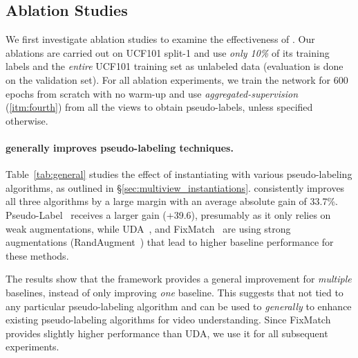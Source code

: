 \documentclass[10pt,twocolumn,letterpaper]{article}
\newcommand{\sref}[1]{\S\ref{#1}}
\begin{document}
\subsection{Ablation Studies}\label{sec:ablation}
We first investigate ablation studies to examine the effectiveness of \oursshort.
Our ablations are carried out on UCF101 split-1 and use \textit{only 10\%} of its training labels and the \textit{entire} UCF101 training set as unlabeled data (evaluation is done on the validation set).  
For all {ablation} experiments, 
we train the network for 600 epochs from scratch {with no warm-up} and use \textit{aggregated-supervision} (\ref{itm:fourth}) from all the views to obtain pseudo-labels, unless specified otherwise.



\paragraph{\oursshort generally improves pseudo-labeling techniques.
}


Table~\ref{tab:general} studies the effect of instantiating \oursshort with various pseudo-labeling algorithms, as outlined in \sref{sec:multiview_instantiations}.
\oursshort consistently improves all three algorithms by a large margin with an average absolute gain of 33.7\%. Pseudo-Label~\cite{lee2013pseudo} receives a larger gain (+39.6), presumably as it only relies on weak augmentations, while  UDA~\cite{uda}, and FixMatch~\cite{fixmatch} are using strong augmentations (RandAugment~\cite{randaug}) that lead to higher baseline performance for these methods. 

The results show that the \oursshort  framework provides a general improvement for \emph{multiple} baselines, instead of only improving  \emph{one} baseline. {This suggests} that  not tied to any particular pseudo-labeling algorithm and can be used to \textit{generally} {to} enhance existing pseudo-labeling algorithms for video understanding. Since FixMatch provides slightly higher performance than UDA, we 
use it for all subsequent experiments.
\end{document}
